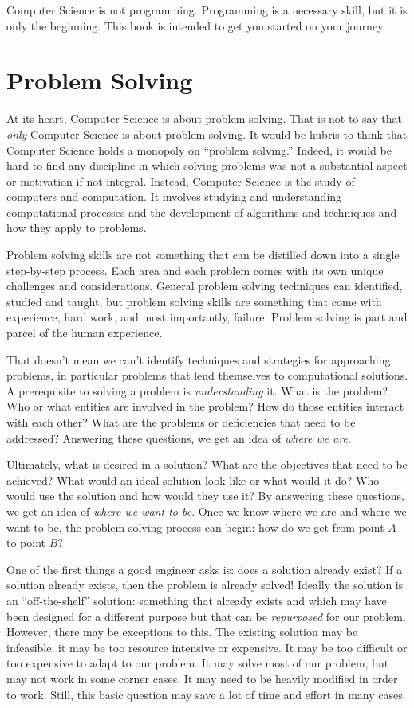 Computer Science is not programming.  Programming is a necessary skill, but
it is only the beginning.  This book is intended to get you started
on your journey.

\section{Problem Solving}

At its heart, Computer Science is about problem solving.  That is not to say that \emph{only} Computer Science is about problem solving.  It would be hubris to think that Computer Science holds a monopoly on ``problem solving.''  Indeed, it would be hard to find any 
discipline in which solving problems was not a substantial aspect or 
motivation if not integral.  Instead, Computer Science is the study of
computers and computation.  It involves studying and understanding 
computational processes and the development of algorithms and techniques 
and how they apply to problems.

Problem solving skills are not something that can be distilled down into 
a single step-by-step process.  Each area and each problem comes with
its own unique challenges and considerations.  General problem solving 
techniques can identified, studied and taught, but problem solving skills 
are something that come with experience, hard work, and most importantly, 
failure.  Problem solving is part and parcel of the human experience.  

That doesn't mean we can't identify techniques and strategies for
approaching problems, in particular problems that lend themselves to
computational solutions.  A prerequisite to solving a problem is 
\emph{understanding} it.  What is the problem?  Who or what entities
are involved in the problem?  How do those entities interact with each
other?  What are the problems or deficiencies that need to be addressed?
Answering these questions, we get an idea of \emph{where we are}.

Ultimately, what is desired in a solution?  What are the objectives that
need to be achieved?  What would an ideal solution look like or what
would it do?  Who would use the solution and how would they use it?
By answering these questions, we get an idea of \emph{where we want to be}.
Once we know where we are and where we want to be, the problem solving
process can begin: how do we get from point $A$ to point $B$?

One of the first things a good engineer asks is: does a solution already exist?
If a solution already exists, then the problem is already solved!  Ideally the
solution is an ``off-the-shelf'' solution: something that already exists 
and which may have been designed for a different purpose but that can
be \emph{repurposed} for our problem.  However, there may be exceptions
to this.  The existing solution may be infeasible: it may be too resource
intensive or expensive.  It may be too difficult or too expensive to adapt
to our problem.  It may solve most of our problem, but may not work in
some corner cases.  It may need to be heavily modified in order to
work.  Still, this basic question may save a lot of time and effort in many
cases.  


